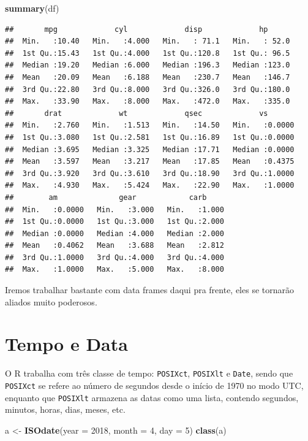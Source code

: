 \documentclass[]{book}
\newenvironment{Shaded}{\begin{snugshade}}{\end{snugshade}}
\newcommand{\KeywordTok}[1]{\textcolor[rgb]{0.13,0.29,0.53}{\textbf{#1}}}
\newcommand{\DataTypeTok}[1]{\textcolor[rgb]{0.13,0.29,0.53}{#1}}
\newcommand{\DecValTok}[1]{\textcolor[rgb]{0.00,0.00,0.81}{#1}}
\newcommand{\StringTok}[1]{\textcolor[rgb]{0.31,0.60,0.02}{#1}}
\newcommand{\NormalTok}[1]{#1}
\theoremstyle{definition}
\theoremstyle{definition}
\theoremstyle{definition}
\theoremstyle{remark}
\begin{document}
\begin{Shaded}
\begin{Highlighting}[]
\KeywordTok{summary}\NormalTok{(df)}
\end{Highlighting}
\end{Shaded}

\begin{verbatim}
##       mpg             cyl             disp             hp       
##  Min.   :10.40   Min.   :4.000   Min.   : 71.1   Min.   : 52.0  
##  1st Qu.:15.43   1st Qu.:4.000   1st Qu.:120.8   1st Qu.: 96.5  
##  Median :19.20   Median :6.000   Median :196.3   Median :123.0  
##  Mean   :20.09   Mean   :6.188   Mean   :230.7   Mean   :146.7  
##  3rd Qu.:22.80   3rd Qu.:8.000   3rd Qu.:326.0   3rd Qu.:180.0  
##  Max.   :33.90   Max.   :8.000   Max.   :472.0   Max.   :335.0  
##       drat             wt             qsec             vs        
##  Min.   :2.760   Min.   :1.513   Min.   :14.50   Min.   :0.0000  
##  1st Qu.:3.080   1st Qu.:2.581   1st Qu.:16.89   1st Qu.:0.0000  
##  Median :3.695   Median :3.325   Median :17.71   Median :0.0000  
##  Mean   :3.597   Mean   :3.217   Mean   :17.85   Mean   :0.4375  
##  3rd Qu.:3.920   3rd Qu.:3.610   3rd Qu.:18.90   3rd Qu.:1.0000  
##  Max.   :4.930   Max.   :5.424   Max.   :22.90   Max.   :1.0000  
##        am              gear            carb      
##  Min.   :0.0000   Min.   :3.000   Min.   :1.000  
##  1st Qu.:0.0000   1st Qu.:3.000   1st Qu.:2.000  
##  Median :0.0000   Median :4.000   Median :2.000  
##  Mean   :0.4062   Mean   :3.688   Mean   :2.812  
##  3rd Qu.:1.0000   3rd Qu.:4.000   3rd Qu.:4.000  
##  Max.   :1.0000   Max.   :5.000   Max.   :8.000
\end{verbatim}

Iremos trabalhar bastante com data frames daqui pra frente, eles se
tornarão aliados muito poderosos.

\section{Tempo e Data}\label{tempo-e-data}

O R trabalha com três classe de tempo: \texttt{POSIXct},
\texttt{POSIXlt} e \texttt{Date}, sendo que \texttt{POSIXct} se refere
ao número de segundos desde o início de 1970 no modo UTC, enquanto que
\texttt{POSIXlt} armazena as datas como uma lista, contendo segundos,
minutos, horas, dias, meses, etc.

\begin{Shaded}
\begin{Highlighting}[]
\NormalTok{a <-}\StringTok{ }\KeywordTok{ISOdate}\NormalTok{(}\DataTypeTok{year =} \DecValTok{2018}\NormalTok{, }\DataTypeTok{month =} \DecValTok{4}\NormalTok{, }\DataTypeTok{day =} \DecValTok{5}\NormalTok{)}
\KeywordTok{class}\NormalTok{(a)}
\end{Highlighting}
\end{Shaded}
\end{document}
